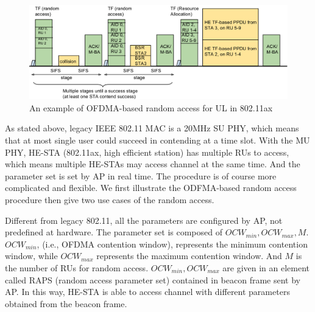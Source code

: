 

\begin{figure}[!t]
\centering
\includegraphics[scale=0.35]{./figure/chp2/RA_illu_2.png}
\caption{An example of OFDMA-based random access for UL in 802.11ax }
\label{fig_ra_ul}
\end{figure}

As stated above, legacy IEEE 802.11 MAC is a 20MHz SU PHY, which means that at most single user could succeed in contending at a time slot.
With the MU PHY, HE-STA (802.11ax, high efficient station) has multiple RUs to access, which means multiple HE-STAs may access channel at the same time.
And the parameter set is set by AP in real time.
The procedure is of course more complicated and flexible.
We first illustrate the ODFMA-based random access procedure then give two use cases of the random access.

Different from legacy 802.11, all the parameters are configured by AP, not predefined at hardware. 
The parameter set is composed of $OCW_{min}, OCW_{max}, M$. $OCW_{min}$, (i.e., OFDMA contention window), represents the minimum contention window, while $OCW_{max}$ represents the maximum contention window. 
And $M$ is the number of RUs for random access. $OCW_{min}, OCW_{max}$ are given in an element called RAPS (random access parameter set) contained in beacon frame sent by AP.
In this way, HE-STA is able to access channel with different parameters obtained from the beacon frame. 



